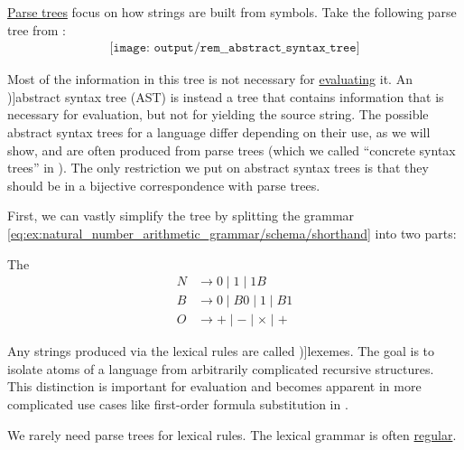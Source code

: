 \begin{concept}\label{con:abstract_syntax_tree}
  \hyperref[def:parse_tree]{Parse trees} focus on how strings are built from symbols. Take the following parse tree from :
  \begin{equation}\label{eq:con:abstract_syntax_tree/base}
    \begin{aligned}
      \texttt{[image: output/rem\_\_abstract\_syntax\_tree]}
    \end{aligned}
  \end{equation}

  Most of the information in this tree is not necessary for \hyperref[con:evaluation]{evaluating} it. An \term[en=abstract syntax tree (\cite[41]{Aho2006})]{abstract syntax tree} (AST) is instead a tree that contains information that is necessary for evaluation, but not for yielding the source string. The possible abstract syntax trees for a language differ depending on their use, as we will show, and are often produced from parse trees (which we called \enquote{concrete syntax trees} in ). The only restriction we put on abstract syntax trees is that they should be in a bijective correspondence with parse trees.

  First, we can vastly simplify the tree by splitting the grammar \eqref{eq:ex:natural_number_arithmetic_grammar/schema/shorthand} into two parts:
  \begin{thmenum}
     The 
    \begin{equation*}
      \begin{aligned}
        N &\to 0 \mid 1 \mid 1 B \\
        B &\to 0 \mid B 0 \mid 1 \mid B 1 \\
        O &\to + \mid - \mid \times \mid +
      \end{aligned}
    \end{equation*}

    Any strings produced via the lexical rules are called \term[ru=лексемы (\cite[329]{Гладкий1973Языки})]{lexemes}. The goal is to isolate atoms of a language from arbitrarily complicated recursive structures. This distinction is important for evaluation and becomes apparent in more complicated use cases like first-order formula substitution in .

    We rarely need parse trees for lexical rules. The lexical grammar is often \hyperref[def:chomsky_hierarchy/regular]{regular}.


\end{thmenum}
\end{concept}
